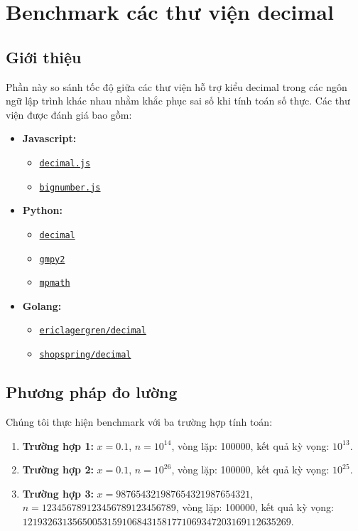 \section{Benchmark các thư viện decimal}

\subsection{Giới thiệu}
Phần này so sánh tốc độ giữa các thư viện hỗ trợ kiểu decimal trong các ngôn ngữ lập trình khác nhau nhằm khắc phục sai số khi tính toán số thực. Các thư viện được đánh giá bao gồm:
\begin{itemize}
  \item \textbf{Javascript:}
    \begin{itemize}
      \item \href{https://mikemcl.github.io/decimal.js}{\texttt{decimal.js}}
      \item \href{https://mikemcl.github.io/bignumber.js/}{\texttt{bignumber.js}}
    \end{itemize}
  \item \textbf{Python:}
    \begin{itemize}
      \item \href{https://docs.python.org/3/library/decimal.html}{\texttt{decimal}}
      \item \href{https://gmpy2.readthedocs.io/en/latest/index.html}{\texttt{gmpy2}}
      \item \href{https://mpmath.org/doc/current/index.html}{\texttt{mpmath}}
    \end{itemize}
  \item \textbf{Golang:}
    \begin{itemize}
      \item \href{https://pkg.go.dev/github.com/ericlagergren/decimal}{\texttt{ericlagergren/decimal}}
      \item \href{https://pkg.go.dev/github.com/shopspring/decimal}{\texttt{shopspring/decimal}}
    \end{itemize}
\end{itemize}

\subsection{Phương pháp đo lường}
Chúng tôi thực hiện benchmark với ba trường hợp tính toán:
\begin{enumerate}
    \item \textbf{Trường hợp 1:} \( x = 0.1 \), \( n = 10^{14} \), vòng lặp: 100000, kết quả kỳ vọng: \( 10^{13} \).
    \item \textbf{Trường hợp 2:} \( x = 0.1 \), \( n = 10^{26} \), vòng lặp: 100000, kết quả kỳ vọng: \( 10^{25} \).
    \item \textbf{Trường hợp 3:} \( x = 987654321987654321987654321 \), \( n = 123456789123456789123456789 \), vòng lặp: 100000, kết quả kỳ vọng: \( 121932631356500531591068431581771069347203169112635269 \).
\end{enumerate}


